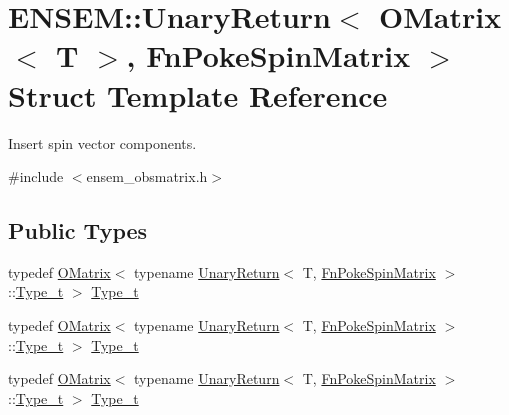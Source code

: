 \hypertarget{structENSEM_1_1UnaryReturn_3_01OMatrix_3_01T_01_4_00_01FnPokeSpinMatrix_01_4}{}\section{E\+N\+S\+EM\+:\+:Unary\+Return$<$ O\+Matrix$<$ T $>$, Fn\+Poke\+Spin\+Matrix $>$ Struct Template Reference}
\label{structENSEM_1_1UnaryReturn_3_01OMatrix_3_01T_01_4_00_01FnPokeSpinMatrix_01_4}


Insert spin vector components.  




{\ttfamily \#include $<$ensem\+\_\+obsmatrix.\+h$>$}

\subsection*{Public Types}
\begin{DoxyCompactItemize}
\item 
typedef \mbox{\hyperlink{classENSEM_1_1OMatrix}{O\+Matrix}}$<$ typename \mbox{\hyperlink{structENSEM_1_1UnaryReturn}{Unary\+Return}}$<$ T, \mbox{\hyperlink{structENSEM_1_1FnPokeSpinMatrix}{Fn\+Poke\+Spin\+Matrix}} $>$\+::\mbox{\hyperlink{structENSEM_1_1UnaryReturn_3_01OMatrix_3_01T_01_4_00_01FnPokeSpinMatrix_01_4_a2018c95323ea7832f6e1e071be4629b8}{Type\+\_\+t}} $>$ \mbox{\hyperlink{structENSEM_1_1UnaryReturn_3_01OMatrix_3_01T_01_4_00_01FnPokeSpinMatrix_01_4_a2018c95323ea7832f6e1e071be4629b8}{Type\+\_\+t}}
\item 
typedef \mbox{\hyperlink{classENSEM_1_1OMatrix}{O\+Matrix}}$<$ typename \mbox{\hyperlink{structENSEM_1_1UnaryReturn}{Unary\+Return}}$<$ T, \mbox{\hyperlink{structENSEM_1_1FnPokeSpinMatrix}{Fn\+Poke\+Spin\+Matrix}} $>$\+::\mbox{\hyperlink{structENSEM_1_1UnaryReturn_3_01OMatrix_3_01T_01_4_00_01FnPokeSpinMatrix_01_4_a2018c95323ea7832f6e1e071be4629b8}{Type\+\_\+t}} $>$ \mbox{\hyperlink{structENSEM_1_1UnaryReturn_3_01OMatrix_3_01T_01_4_00_01FnPokeSpinMatrix_01_4_a2018c95323ea7832f6e1e071be4629b8}{Type\+\_\+t}}
\item 
typedef \mbox{\hyperlink{classENSEM_1_1OMatrix}{O\+Matrix}}$<$ typename \mbox{\hyperlink{structENSEM_1_1UnaryReturn}{Unary\+Return}}$<$ T, \mbox{\hyperlink{structENSEM_1_1FnPokeSpinMatrix}{Fn\+Poke\+Spin\+Matrix}} $>$\+::\mbox{\hyperlink{structENSEM_1_1UnaryReturn_3_01OMatrix_3_01T_01_4_00_01FnPokeSpinMatrix_01_4_a2018c95323ea7832f6e1e071be4629b8}{Type\+\_\+t}} $>$ \mbox{\hyperlink{structENSEM_1_1UnaryReturn_3_01OMatrix_3_01T_01_4_00_01FnPokeSpinMatrix_01_4_a2018c95323ea7832f6e1e071be4629b8}{Type\+\_\+t}}
\end{DoxyCompactItemize}



